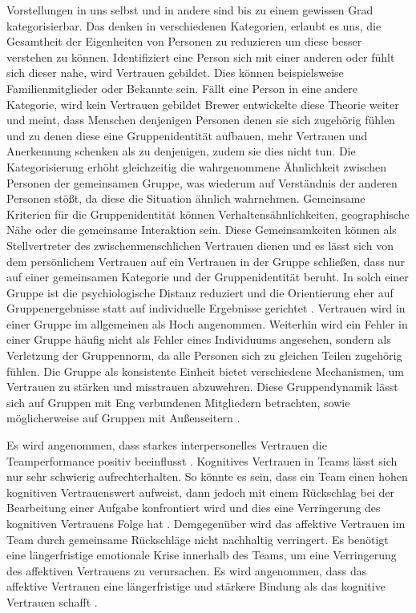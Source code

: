 \documentclass[a4paper,11pt]{article}%
\renewcommand{\\}{\vspace*{0.5\baselineskip} \newline}
\begin{document}
Vorstellungen in uns selbst und in andere sind bis zu einem gewissen Grad kategorisierbar. Das denken in verschiedenen Kategorien, erlaubt es uns, die Gesamtheit der Eigenheiten von Personen zu reduzieren um diese besser verstehen zu können. Identifiziert eine Person sich mit einer anderen oder fühlt sich dieser nahe, wird Vertrauen gebildet. Dies können beispielsweise Familienmitglieder oder Bekannte sein. Fällt eine Person in eine andere Kategorie, wird kein Vertrauen gebildet
\citep[397-403]{stolle2002trusting}
Brewer entwickelte diese Theorie weiter und meint, dass Menschen denjenigen Personen denen sie sich zugehörig fühlen und zu denen diese eine Gruppenidentität aufbauen, mehr Vertrauen und Anerkennung schenken als zu denjenigen, zudem sie dies nicht tun. Die Kategorisierung erhöht gleichzeitig die wahrgenommene Ähnlichkeit zwischen Personen der gemeinsamen Gruppe, was wiederum auf Verständnis der anderen Personen stößt, da diese die Situation ähnlich wahrnehmen.
Gemeinsame Kriterien für die Gruppenidentität können Verhaltensähnlichkeiten, geographische Nähe oder die gemeinsame Interaktion sein. Diese Gemeinsamkeiten können als Stellvertreter des zwischenmenschlichen Vertrauen dienen und es lässt sich von dem \dq{}persönlichem\dq{} Vertrauen auf ein \dq{} Vertrauen in der Gruppe \dq{} schließen, dass nur auf einer gemeinsamen Kategorie und der Gruppenidentität beruht.
In solch einer Gruppe ist die psychiologische Distanz reduziert und die Orientierung eher auf Gruppenergebnisse statt auf individuelle Ergebnisse gerichtet \citep[355-360]{brewer1981}.
Vertrauen wird in einer Gruppe im allgemeinen als Hoch angenommen. Weiterhin wird ein Fehler in einer Gruppe häufig nicht als Fehler eines Individuums angesehen, sondern als Verletzung der Gruppennorm, da alle Personen sich zu gleichen Teilen zugehörig fühlen. Die Gruppe als konsistente Einheit bietet verschiedene Mechanismen, um Vertrauen zu stärken und misstrauen abzuwehren. Diese Gruppendynamik lässt sich auf Gruppen mit Eng verbundenen Mitgliedern betrachten, sowie möglicherweise auf Gruppen mit Außenseitern \citep[397-403]{stolle2002trusting}.

Es wird angenommen, dass starkes interpersonelles Vertrauen die Teamperformance positiv beeinflusst \citep{mcallister1995affect} \citep{mayer1995integrative} \citep{dirks2002trust}.
Kognitives Vertrauen in Teams lässt sich nur sehr schwierig aufrechterhalten. So könnte es sein, dass ein Team einen hohen kognitiven Vertrauenswert aufweist, dann jedoch mit einem Rückschlag bei der Bearbeitung einer Aufgabe konfrontiert wird und dies eine Verringerung des kognitiven Vertrauens Folge hat \citep[p.29-31]{mcallister1995affect}.
Demgegenüber wird das affektive Vertrauen im Team durch gemeinsame Rückschläge nicht nachhaltig verringert. Es benötigt eine längerfristige emotionale Krise innerhalb des Teams, um eine Verringerung des affektiven Vertrauens zu verursachen. Es wird angenommen, dass das affektive Vertrauen eine längerfristige und stärkere Bindung als das kognitive Vertrauen schafft \citep[p.29-31]{mcallister1995affect}.
\end{document}
